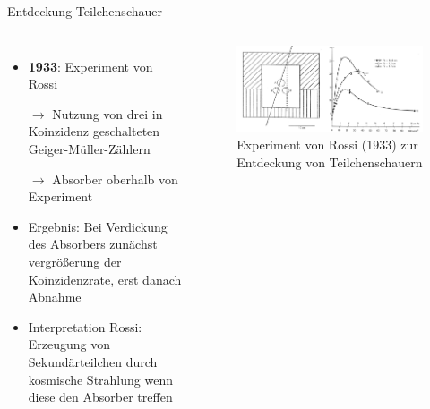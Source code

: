 \documentclass[aspectratio=1610, professionalfonts, 9pt, hyperref={colorlinks=false}]{beamer}
\begin{document}
\begin{frame}{Entdeckung Teilchenschauer}
  \begin{columns}
      \begin{itemize}
        \setlength\itemsep{0.5em}
        \item \textbf{1933}: Experiment von Rossi\item[$\rightarrow$]
        Nutzung von drei in Koinzidenz geschalteten Geiger-Müller-Zählern
        \item[$\rightarrow$] Absorber oberhalb von Experiment
        \item Ergebnis: Bei Verdickung des Absorbers zunächst vergrößerung der Koinzidenzrate, erst danach Abnahme
        \item Interpretation Rossi: Erzeugung von Sekundärteilchen durch kosmische Strahlung wenn diese den Absorber treffen
      \end{itemize}
        \vspace*{10px}
  
      \begin{figure}
          \centering
          \includegraphics[width=\linewidth]{images/Rossis-transition-curve-The-experiment-in-which-the-abundant-production-of-secondary.png}
          \caption{Experiment von Rossi (1933) zur Entdeckung von Teilchenschauern \cite{9789400754225}}
      \end{figure}
  \end{columns}
\end{frame}
\end{document}
